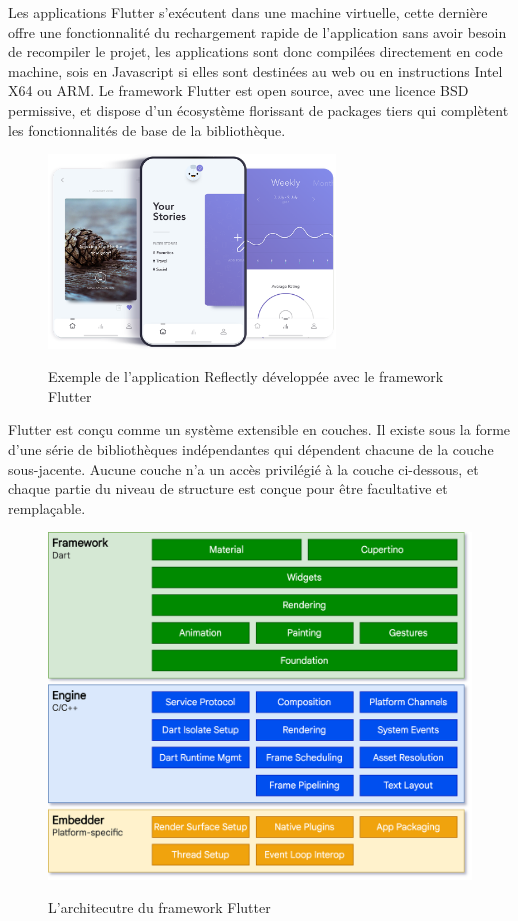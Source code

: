 Les applications Flutter s’exécutent dans une machine virtuelle, cette dernière offre une fonctionnalité du rechargement rapide de l’application sans avoir besoin de recompiler le projet, les applications sont donc compilées directement en code machine, sois en Javascript si elles sont destinées au web ou en instructions Intel X64 ou ARM. 
\newpage
Le framework Flutter est open source, avec une licence BSD permissive, et dispose d'un écosystème florissant de packages tiers qui complètent les fonctionnalités de base de la bibliothèque.
\begin{figure}[!h]

    \centering
    \includegraphics[width=3in]{images/Chapitre2/reflectly_app.png}
    \label{fig:firebasepricing}
    \caption{Exemple de l'application Reflectly développée avec le framework Flutter}
\end{figure}

Flutter est conçu comme un système extensible en couches. Il existe sous la forme d'une série de bibliothèques indépendantes qui dépendent chacune de la couche sous-jacente. Aucune couche n'a un accès privilégié à la couche ci-dessous, et chaque partie du niveau de structure est conçue pour être facultative et remplaçable.~\cite{FlutterArchitecturalOverview}

\begin{figure}[!h]

    \centering
    \includegraphics[width=5in]{images/Chapitre2/flutter_architectures.png}
    \label{fig:firebasepricing}
    \caption{L'architecutre du framework Flutter}
\end{figure}

